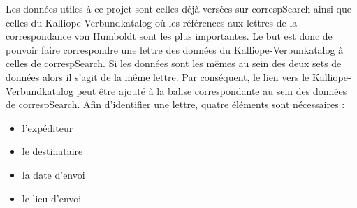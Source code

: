 \documentclass[a4paper, 12pt, twoside]{book}
\begin{document}
Les données utiles à ce projet sont celles déjà versées sur correspSearch ainsi que celles du Kalliope-Verbundkatalog où les références aux lettres de la correspondance von Humboldt sont les plus importantes. Le but est donc de pouvoir faire correspondre une lettre des données du Kalliope-Verbunkatalog à celles de correspSearch. Si les données sont les mêmes au sein des deux sets de données alors il s'agit de la même lettre. Par conséquent, le lien vers le Kalliope-Verbundkatalog peut être ajouté à la balise correspondante au sein des données de correspSearch. Afin d'identifier une lettre, quatre éléments sont nécessaires :
\begin{itemize}
    \item l'expéditeur
    \item le destinataire
    \item la date d'envoi
    \item le lieu d'envoi
\end{itemize}
\end{document}
